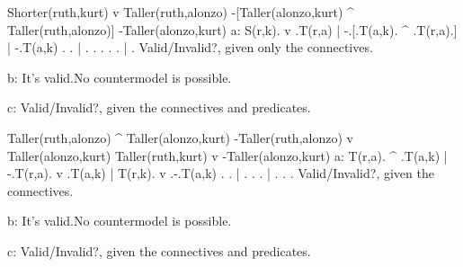 	\endanswerlist

\argument
 Shorter(ruth,kurt) v Taller(ruth,alonzo)
 -[Taller(alonzo,kurt) ^ Taller(ruth,alonzo)]
\argumentline
 -Taller(alonzo,kurt)
\endargument
	\answerlist
	a:
	\truthtable
	 S(r,k). v .T(r,a) | -.[.T(a,k). ^ .T(r,a).] | -.T(a,k)
	\truthtableline
	       .   .       |  . .      .   .      .  |  .
	\endtruthtable
	Valid/Invalid?, given only the connectives.

	b: It's valid.\OR No countermodel is possible.\OR
	\heightmodel
	 
	\endheightmodel

	c: Valid/Invalid?, given the connectives and predicates.
	\endanswerlist

\argument
 Taller(ruth,alonzo) ^ Taller(alonzo,kurt)
 -Taller(ruth,alonzo) v Taller(alonzo,kurt)
\argumentline
 Taller(ruth,kurt) v -Taller(alonzo,kurt) 
\endargument
	\answerlist
	a:
	\truthtable
	 T(r,a). ^ .T(a,k) | -.T(r,a). v .T(a,k) | T(r,k). v .-.T(a,k)
	\truthtableline
	       .   .       |  .      .   .       |       .   . .
	\endtruthtable
	Valid/Invalid?, given the connectives.

	b: It's valid.\OR No countermodel is possible.\OR
	\heightmodel
	 
	\endheightmodel

	c: Valid/Invalid?, given the connectives and predicates.
	\endanswerlist

\endproblems
\bye
